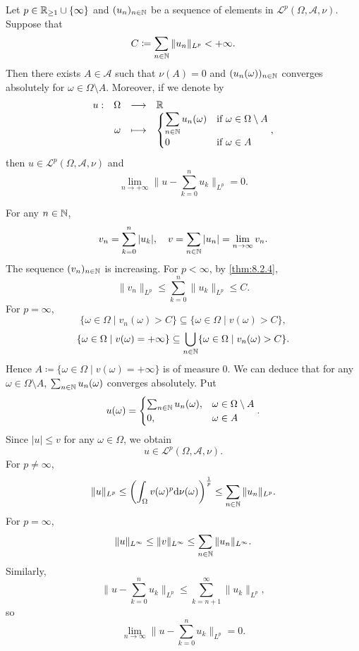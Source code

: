 \begin{lemmaenv}\label{lem:8.2.6}
    Let $p \in \mathbb{R}_{\ge 1} \cup \{\infty\}$ and $(u_n)_{n \in \mathbb{N}}$ be a sequence of elements in $\mathcal{L}^{p}(\Omega,\mathscr{A},\nu)$.
    Suppose that
    $$C \coloneq \sum_{n \in \mathbb{N}}\|u_n\|_{L^p} < + \infty.$$
    Then there exists $A \in \mathscr{A}$ such that $\nu(A) = 0$ and $(u_n(\omega))_{n \in \mathbb{N}}$ converges absolutely for $\omega \in \Omega \setminus A$.
    Moreover, if we denote by
    $$\begin{array}{rrcl}
        u : & \Omega & \longrightarrow & \mathbb{R}\\
        & \omega & \longmapsto & \begin{cases}
            \displaystyle \sum_{n \in \mathbb{N}} u_n(\omega) & \text{if } \omega \in \Omega \setminus A\\
            0 & \text{if } \omega \in A
        \end{cases},
    \end{array}$$
    then $u \in \mathcal{L}^p(\Omega,\mathscr{A},\nu)$ and
    $$\lim_{n \rightarrow +\infty}\|u - \sum_{k=0}^{n}u_k\|_{L^p} = 0.$$
\end{lemmaenv}
\begin{proofenv}
    For any $n \in \mathbb{N}$,
    $$v_n = \sum_{k=0}^{n}|u_k|, \quad v = \sum_{n \in \mathbb{N}}|u_n| = \lim_{n \rightarrow \infty} v_n.$$
    The sequence $(v_n)_{n \in \mathbb{N}}$ is increasing.
    For $p < \infty$, by \ref{thm:8.2.4},
    $$\|v_n\|_{L^p} \le \sum_{k=0}^{n} \|u_k\|_{L^p} \le C.$$
    For $p = \infty$,
    $$\{\omega \in \Omega \mid v_n(\omega) > C\} \subseteq \{\omega \in \Omega \mid v(\omega) > C\},$$
    $$\{\omega \in \Omega \mid v(\omega) = +\infty\} \subseteq \bigcup_{n \in \mathbb{N}} \{\omega \in \Omega \mid v_{n}(\omega) > C\}.$$
    Hence $A \coloneq \{\omega \in \Omega \mid v(\omega) = + \infty\}$ is of measure $0$.
    We can deduce that for any $\omega \in \Omega \setminus A$, $\sum_{n \in \mathbb{N}} u_n (\omega)$ converges absolutely.
    Put
    $$u(\omega) = \begin{cases}
        \sum_{n \in \mathbb{N}} u_n(\omega), & \omega \in \Omega \setminus A\\
        0, & \omega \in A
    \end{cases}.$$
    Since $|u|\le v$ for any $\omega \in \Omega$, we obtain
    $$u \in \mathcal{L}^p(\Omega,\mathscr{A},\nu).$$
    For $p \neq \infty$,
    $$\|u\|_{L^p} \le \left(\int_{\Omega} v(\omega)^p \mathrm{d} \nu(\omega)\right)^{\frac{1}{p}} \le \sum_{n \in \mathbb{N}} \|u_n\|_{L^p}.$$
    For $p = \infty$,
    $$\|u\|_{L^\infty} \le \|v\|_{L^\infty} \le \sum_{n \in \mathbb{N}} \|u_n\|_{L^\infty}.$$
    Similarly,
    $$\|u - \sum_{k=0}^{n}u_k\|_{L^p} \le \sum_{k=n+1}^{\infty}\|u_k\|_{L^p},$$
    so
    $$\lim_{n \rightarrow \infty} \|u - \sum_{k=0}^{n} u_k\|_{L^p} = 0.$$
\end{proofenv}


